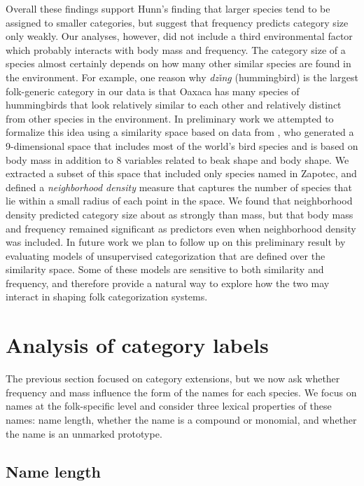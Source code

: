 \documentclass[10pt,letterpaper]{article}
\begin{document}
Overall these findings support Hunn's finding that larger species tend to be assigned to smaller categories, but suggest that frequency predicts category size only weakly. Our analyses, however,  did not include a third environmental factor  which probably interacts with body mass and frequency. The category size of a species almost certainly depends on how many other similar species are found in the environment. For example, one reason why \textit{dz\v{\i}n\b{g}} (hummingbird) is the largest folk-generic category in our data is that Oaxaca has many species of hummingbirds that look relatively similar to each other and relatively distinct from other species in the environment. In preliminary work we attempted to formalize this idea using a similarity space based on data from \cite{pigot}, who generated a 9-dimensional space that includes most of the world's bird species and is based on body mass in addition to 8 variables related to beak shape and body shape. We extracted a subset of this space that included only species named in Zapotec, and defined a \emph{neighborhood density} measure that captures the number of species that lie within a small radius of each point in the space. We found that neighborhood density predicted category size about as strongly than mass, but that body mass and frequency remained significant as predictors even when neighborhood density was included. In future work we plan to follow up on this preliminary result by evaluating models of unsupervised categorization that are defined over the similarity space. Some of these models are sensitive to both similarity and frequency, and therefore provide a natural way to explore how the two may interact in shaping folk categorization systems.

\section{Analysis of category labels}

The previous section focused on category extensions, but we now ask whether frequency and mass influence the form of the names for each species. We focus on names at the folk-specific level and consider three lexical properties of these names: name length, whether the name is a compound or monomial, and whether the name is an unmarked prototype.

\subsection{Name length}
\end{document}
